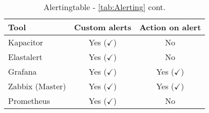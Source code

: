 \begin{table}
	\centering
	\begin{tabular}{lcc}
		\hline
		Tool & Custom alerts & Action on alert \\
		\hline
		Kapacitor                    & Yes ($ \checkmark $)       & No\\
		Elastalert                   & Yes ($ \checkmark $) & No\\
		Grafana                      & Yes ($ \checkmark $)          & Yes ($ \checkmark $)\\
		Zabbix (Master) & Yes ($ \checkmark $) & Yes ($ \checkmark $)\\
		Prometheus & Yes ($ \checkmark $) & No \\
		\hline 
	\end{tabular}
	\caption{Alertingtable - \cref{tab:Alerting} cont.}
	\label{tab:Alertingcont}
\end{table}